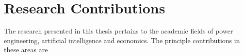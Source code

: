 


\section{Research Contributions}
The research presented in this thesis pertains to the academic fields of power
engineering, artificial intelligence and economics.  The principle
contributions in these areas are

